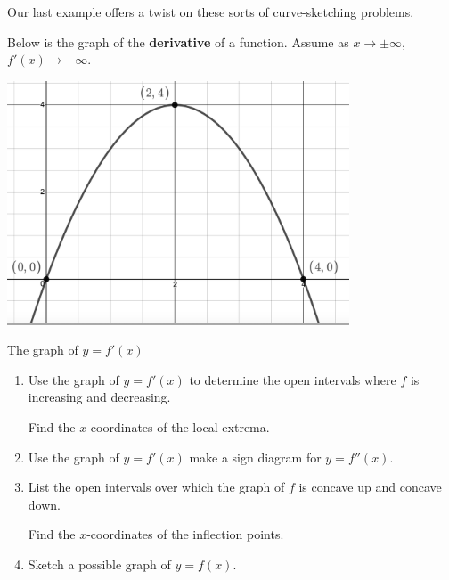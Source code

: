 \documentclass{ximera}
\begin{document}
\medskip

Our last example offers a twist on these sorts of curve-sketching problems.

\pagebreak

\begin{ex}\label{graphfromderivativegraphex} Below is the graph of the \textbf{derivative} of a function.  Assume as $x \rightarrow \pm \infty$, $f'(x) \rightarrow -\infty$.


\begin{center}

\includegraphics[width=4in]{./AppDerivativesGraphics/derivgraph.PNG}

The graph of $y=f'(x)$

\end{center}

\begin{enumerate}

\item  Use the graph of $y=f'(x)$ to determine the open intervals where $f$ is increasing and decreasing.  

\medskip

Find the $x$-coordinates of the local extrema.

\medskip

\item  Use the graph of $y=f'(x)$ make a sign diagram for $y=f''(x)$.

\medskip

\item  List the open intervals over which the graph of $f$ is concave up and concave down.  

\medskip

Find the $x$-coordinates of the inflection points. 

\medskip

\item  Sketch a possible graph of $y = f(x)$.


\end{enumerate}
\end{ex}
\end{document}
